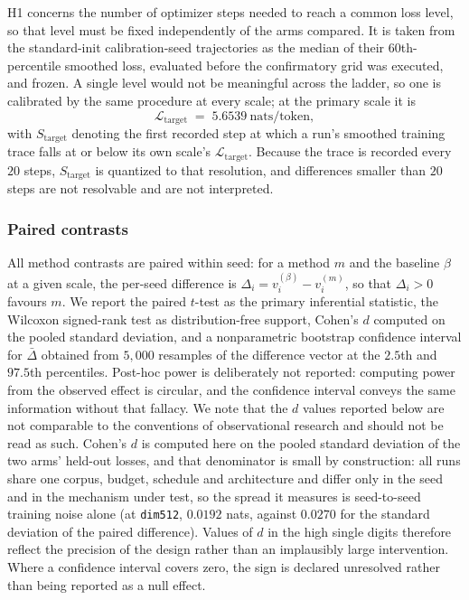 \documentclass[final,5p,times,twocolumn]{elsarticle}
\theoremstyle{remark}
\begin{document}
H1 concerns the number of optimizer steps needed to reach a common loss
level, so that level must be fixed independently of the arms compared. It is
taken from the standard-init calibration-seed trajectories as the median of
their $60$th-percentile smoothed loss, evaluated before
the confirmatory grid was executed, and frozen. A single level would not be
meaningful across the ladder, so one is calibrated by the same procedure at
every scale; at the primary scale it is
\begin{equation}
\label{eq:h1target}
\mathcal{L}_{\mathrm{target}} \;=\; 5.6539 \ \text{nats/token},
\end{equation}
with $S_{\mathrm{target}}$ denoting the first recorded step at which a run's
smoothed training trace falls at or below its own scale's
$\mathcal{L}_{\mathrm{target}}$.
Because the trace is recorded every $20$ steps, $S_{\mathrm{target}}$ is
quantized to that resolution, and differences smaller than $20$ steps are not
resolvable and are not interpreted.

\subsubsection{Paired contrasts}

All method contrasts are paired within seed: for a method $m$ and the baseline
$\beta$ at a given scale, the per-seed difference is
$\Delta_{i} = v^{(\beta)}_{i} - v^{(m)}_{i}$, so that $\Delta_{i} > 0$ favours
$m$. We report the paired $t$-test as the primary inferential statistic, the
Wilcoxon signed-rank test as distribution-free support, Cohen's $d$ computed on
the pooled standard deviation, and a nonparametric bootstrap confidence interval
for $\bar{\Delta}$ obtained from $5{,}000$ resamples of the difference vector at
the $2.5$th and $97.5$th percentiles. Post-hoc power is deliberately not
reported: computing power from the observed effect is circular, and the
confidence interval conveys the same information without that fallacy. We note
that the $d$ values reported below are not comparable to the conventions of
observational research and should not be read as such. Cohen's $d$ is computed
here on the pooled standard deviation of the two arms' held-out losses, and
that denominator is small by construction: all runs share one corpus, budget,
schedule and architecture and differ only in the seed and in the mechanism
under test, so the spread it measures is seed-to-seed training noise alone (at
\texttt{dim512}, $0.0192$ nats, against $0.0270$ for the standard deviation of
the paired difference). Values of $d$ in the high single digits therefore
reflect the precision of the design rather than an implausibly large
intervention. Where a
confidence interval covers zero, the sign is declared unresolved rather than
being reported as a null effect.
\end{document}
